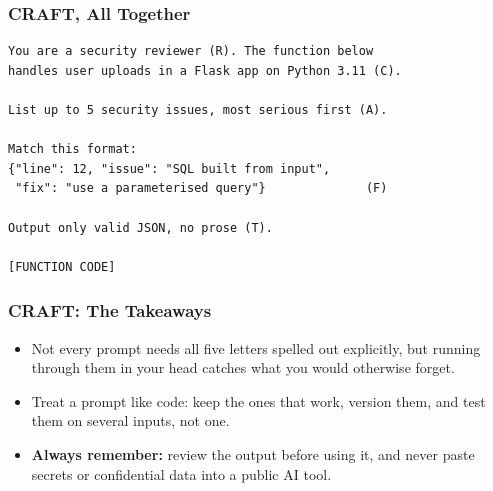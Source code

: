 \begin{frame}[fragile]\frametitle{CRAFT, All Together}

\begin{lstlisting}[language=HTML]
You are a security reviewer (R). The function below
handles user uploads in a Flask app on Python 3.11 (C).

List up to 5 security issues, most serious first (A).

Match this format:
{"line": 12, "issue": "SQL built from input",
 "fix": "use a parameterised query"}              (F)

Output only valid JSON, no prose (T).

[FUNCTION CODE]
\end{lstlisting}

\end{frame}

\begin{frame}[fragile]\frametitle{CRAFT: The Takeaways}

\begin{itemize}
    \item Not every prompt needs all five letters spelled out explicitly, but running through them in your head catches what you would otherwise forget.
    \item Treat a prompt like code: keep the ones that work, version them, and test them on several inputs, not one.
    \item \textbf{Always remember:} review the output before using it, and never paste secrets or confidential data into a public AI tool.
\end{itemize}

\end{frame}
